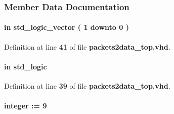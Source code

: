 \subsubsection{Member Data Documentation}
\paragraph[{ch\+\_\+en}]{ {\bfseries \textcolor{keywordflow}{in}\textcolor{vhdlchar}{ }} {\bfseries \textcolor{comment}{std\+\_\+logic\+\_\+vector}\textcolor{vhdlchar}{ }\textcolor{vhdlchar}{(}\textcolor{vhdlchar}{ }\textcolor{vhdlchar}{ } \textcolor{vhdldigit}{1} \textcolor{vhdlchar}{ }\textcolor{keywordflow}{downto}\textcolor{vhdlchar}{ }\textcolor{vhdlchar}{ } \textcolor{vhdldigit}{0} \textcolor{vhdlchar}{ }\textcolor{vhdlchar}{)}\textcolor{vhdlchar}{ }} \hspace{0.3cm}{\ttfamily [Port]}}\label{classpackets2data__top_a6494f316f504075c4ccf47146756d576}


Definition at line {\bf 41} of file {\bf packets2data\+\_\+top.\+vhd}.

\paragraph[{ddr\+\_\+en}]{ {\bfseries \textcolor{keywordflow}{in}\textcolor{vhdlchar}{ }} {\bfseries \textcolor{comment}{std\+\_\+logic}\textcolor{vhdlchar}{ }} \hspace{0.3cm}{\ttfamily [Port]}}\label{classpackets2data__top_adbfe05e6692f69f8e592df06c6055f0a}


Definition at line {\bf 39} of file {\bf packets2data\+\_\+top.\+vhd}.

\paragraph[{decomp\+\_\+fifo\+\_\+size}]{ {\bfseries \textcolor{vhdlchar}{ }} {\bfseries \textcolor{comment}{integer}\textcolor{vhdlchar}{ }\textcolor{vhdlchar}{ }\textcolor{vhdlchar}{\+:}\textcolor{vhdlchar}{=}\textcolor{vhdlchar}{ }\textcolor{vhdlchar}{ } \textcolor{vhdldigit}{9} \textcolor{vhdlchar}{ }} \hspace{0.3cm}{\ttfamily [Generic]}}\label{classpackets2data__top_a461d67b8d13cf91548bb3458b53b723e}


